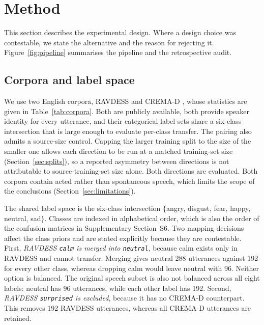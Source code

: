 \section{Method}
\label{sec:method}

This section describes the experimental design. Where a design choice was
contestable, we state the alternative and the reason for rejecting it.
Figure~\ref{fig:pipeline} summarises the pipeline and the retrospective audit.

\subsection{Corpora and label space}
\label{sec:corpora}

We use two English corpora, RAVDESS \cite{livingstone2018ryerson} and CREMA-D
\cite{cao2014crema}, whose statistics are given in Table~\ref{tab:corpora}.
Both are publicly available, both provide speaker identity for every utterance,
and their categorical label sets share a six-class intersection that is large
enough to evaluate per-class transfer. The pairing also admits a source-size
control. Capping the larger training split to the size of the smaller one
allows each direction to be run at a matched training-set size
(Section~\ref{sec:splits}), so a reported asymmetry between directions is not
attributable to source-training-set size alone. Both directions are evaluated.
Both corpora contain acted rather than spontaneous speech, which limits the
scope of the conclusions (Section~\ref{sec:limitations}).

The shared label space is the six-class intersection
$\{$angry, disgust, fear, happy, neutral, sad$\}$. Classes are indexed in
alphabetical order, which is also the order of the confusion matrices in
Supplementary Section~S6. Two mapping decisions affect the class priors and are
stated explicitly because they are contestable. First, \emph{RAVDESS
\texttt{calm} is merged into \texttt{neutral}}, because calm exists only in
RAVDESS and cannot transfer. Merging gives neutral 288 utterances against 192
for every other class, whereas dropping calm would leave neutral with 96.
Neither option is balanced. The original speech subset is also not balanced
across all eight labels: neutral has 96 utterances, while each other label has
192. Second, \emph{RAVDESS \texttt{surprised} is excluded}, because it has no
CREMA-D counterpart. This removes 192 RAVDESS utterances, whereas all CREMA-D
utterances are retained.



